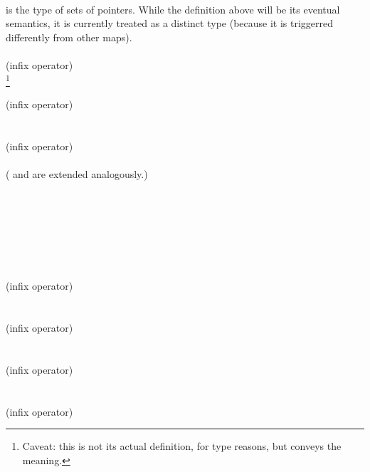 \documentclass[preprint,nocopyrightspace]{sigplanconf}
\begin{document}
{{ \\
\vcc{\objset} is the type of sets of pointers. While the definition
above will be its eventual semantics, it is currently treated 
as a distinct type (because it is triggerred differently from other
maps). 
\\\\
 (infix operator)\\
\footnote{
Caveat: this is not its actual definition, for type reasons, but
conveys the meaning.}
\\\\
 (infix operator)\\
\\\\
 (infix operator)\\
\\
(\vcc{+=} and \vcc{-=} are extended analogously.)
\\\\
\\
\\\\
\\
\\\\
 (infix operator)\\
\\\\
 (infix operator)\\
\\\\
 (infix operator)\\
\\\\
 (infix operator) \\

}}
\end{document}
